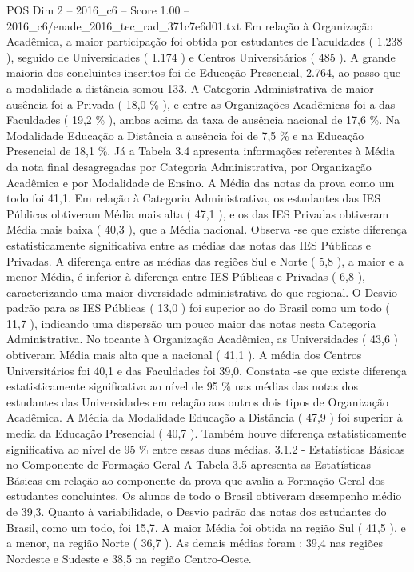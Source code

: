 \begin{textsample}{POS Dim 2 – 2016\_c6 – Score 1.00 – 2016\_c6/enade\_2016\_tec\_rad\_371c7e6d01.txt}
Em relação à Organização Acadêmica, a maior participação foi obtida por estudantes de Faculdades ( 1.238 ), seguido de Universidades ( 1.174 ) e Centros Universitários ( 485 ).
A grande maioria dos concluintes inscritos foi de Educação Presencial, 2.764, ao passo que a modalidade a distância somou 133.
A Categoria Administrativa de maior ausência foi a Privada ( 18,0 \% ), e entre as Organizações Acadêmicas foi a das Faculdades ( 19,2 \% ), ambas acima da taxa de ausência nacional de 17,6 \%.
Na Modalidade Educação a Distância a ausência foi de 7,5 \% e na Educação Presencial de 18,1 \%.
Já a Tabela 3.4 apresenta informações referentes à Média da nota final desagregadas por Categoria Administrativa, por Organização Acadêmica e por Modalidade de Ensino.
A Média das notas da prova como um todo foi 41,1.
Em relação à Categoria Administrativa, os estudantes das IES Públicas obtiveram Média mais alta ( 47,1 ), e os das IES Privadas obtiveram Média mais baixa ( 40,3 ), que a Média nacional.
Observa -se que existe diferença estatisticamente significativa entre as médias das notas das IES Públicas e Privadas.
A diferença entre as médias das regiões Sul e Norte ( 5,8 ), a maior e a menor Média, é inferior à diferença entre IES Públicas e Privadas ( 6,8 ), caracterizando uma maior diversidade administrativa do que regional.
O Desvio padrão para as IES Públicas ( 13,0 ) foi superior ao do Brasil como um todo ( 11,7 ), indicando uma dispersão um pouco maior das notas nesta Categoria Administrativa.
No tocante à Organização Acadêmica, as Universidades ( 43,6 ) obtiveram Média mais alta que a nacional ( 41,1 ).
A média dos Centros Universitários foi 40,1 e das Faculdades foi 39,0.
Constata -se que existe diferença estatisticamente significativa ao nível de 95 \% nas médias das notas dos estudantes das Universidades em relação aos outros dois tipos de Organização Acadêmica.
A Média da Modalidade Educação a Distância ( 47,9 ) foi superior à media da Educação Presencial ( 40,7 ).
Também houve diferença estatisticamente significativa ao nível de 95 \% entre essas duas médias. 3.1.2 - Estatísticas Básicas no Componente de Formação Geral A Tabela 3.5 apresenta as Estatísticas Básicas em relação ao componente da prova que avalia a Formação Geral dos estudantes concluintes.
Os alunos de todo o Brasil obtiveram desempenho médio de 39,3.
Quanto à variabilidade, o Desvio padrão das notas dos estudantes do Brasil, como um todo, foi 15,7.
A maior Média foi obtida na região Sul ( 41,5 ), e a menor, na região Norte ( 36,7 ).
As demais médias foram : 39,4 nas regiões Nordeste e Sudeste e 38,5 na região Centro-Oeste.

\end{textsample}
